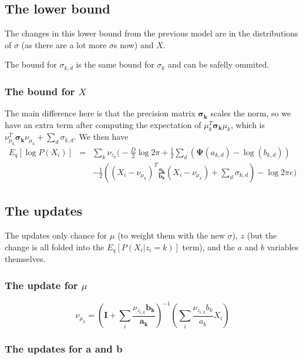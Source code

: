 \documentclass{article}
\newcommand{\digamma}{\bm{\Psi}}
\newcommand{\m}[1]{\nu_{#1}}
\begin{document}
\subsection{The lower bound}
\label{sec:lower-bound}

The changes in this lower bound from the previous model are in the
distributions of $\sigma$ (as there are a lot more $\sigma$s now) and $X$.

The bound for $\sigma_{k,d}$ is the same bound for $\sigma_k$ and can
be safelly ommited.

\subsubsection{The bound for $X$}
\label{sec:bound-x}

The main difference here is that the precision matrix $\bm{\sigma_k}$
scales the norm, so we have an extra term after computing the
expectation of $\mu_k^T\bm{\sigma_k}\mu_k$, which is
$\m{\mu_k}^T\bm{\sigma_k}\m{\mu_k} + \sum_d \sigma_{k,d}$. We then
have
\begin{eqnarray*}
  E_q[\log P(X_i)] &=& \sum_k \m{z_k} \Big( - \frac{D}{2}\log 2\pi 
    +\frac{1}{2}\sum_d (\digamma(a_{k,d}) - \log(b_{k,d})) \\
    && 
    -\frac{1}{2}((X_i - \m{\mu_k})^T\bm{\frac{a_k}{b_k}}(X_i - \m{\mu_k})+ \sum_d \sigma_{k,d})- \log 2 \pi e  \Big)
\end{eqnarray*}


\subsection{The updates}
\label{sec:updates-1}

The updates only chance for $\mu$ (to weight them with the new
$\sigma$), $z$ (but the change is all folded into the
$E_q[P(X_i|z_i=k)]$ term), and the $a$ and $b$ variables themselves.

\subsubsection{The update for $\mu$}
\label{sec:update-mu}

\begin{equation}
  \m{\mu_k} = \left(\mathbf{I}+\sum_i \frac{\m{z_{i,k}}\mathbf{b_k}}{\mathbf{a_k}}\right)^{-1}\left(\sum_i \frac{\m{z_{i,k}}b_k}{a_k}X_i\right)
\end{equation}


\subsubsection{The updates for a and b}
\label{sec:updates-b}
\end{document}
